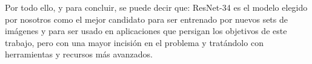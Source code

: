 


Por todo ello, y para concluir, se puede decir que: ResNet-34 es el modelo elegido por nosotros como el mejor candidato para ser entrenado por nuevos sets de imágenes y para ser usado en aplicaciones que persigan los objetivos de este trabajo, pero con una mayor incisión en el problema y tratándolo con herramientas y recursos más avanzados.